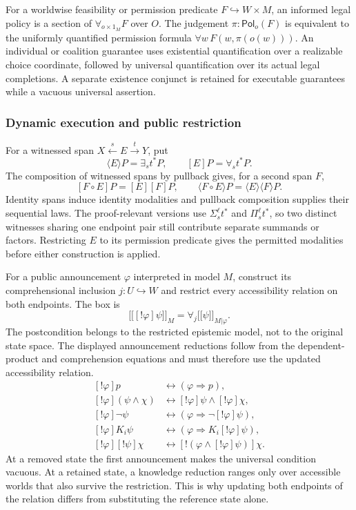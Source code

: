 \documentclass[11pt,a4paper]{article}
\numberwithin{equation}{section}
\theoremstyle{definition}
\theoremstyle{remark}
\theoremstyle{plain}
\providecommand{\llbracket}{\mathopen{[\![}}
\providecommand{\rrbracket}{\mathclose{]\!]}}
\begin{document}
For a worldwise feasibility or permission predicate $F\hookrightarrow
W\times M$, an informed legal policy is a section of
$\forall_{o\times1_M}F$ over $O$.  The judgement
$\pi:\mathsf{Pol}_o(F)$ is equivalent to the uniformly quantified
permission formula $\forall w\,F(w,\pi(o(w)))$.
An individual or coalition guarantee uses existential quantification
over a realizable choice coordinate, followed by universal quantification
over its actual legal completions.  A separate existence conjunct is
retained for executable guarantees while a
vacuous universal assertion.

\subsubsection{Dynamic execution and public restriction}

For a witnessed span $X\xleftarrow{s}E\xrightarrow{t}Y$, put
\[
\langle E\rangle P=\exists_s t^*P,
\qquad [E]P=\forall_s t^*P.
\]
The composition of witnessed spans by pullback gives, for a second
span $F$,
\[
[F\circ E]P=[E][F]P,
\qquad\langle F\circ E\rangle P
=\langle E\rangle\langle F\rangle P.
\]
Identity spans induce identity modalities and pullback
composition supplies their sequential laws. The proof-relevant
versions use $\Sigma_s^\ell t^*$ and $\Pi_s^\ell t^*$, so two
distinct witnesses sharing one endpoint pair still contribute
separate summands or factors. Restricting $E$ to its permission predicate gives the permitted
modalities before either construction is applied.

For a public announcement $\varphi$ interpreted in model $M$,
construct its comprehensional inclusion $j:U\hookrightarrow W$ and
restrict every accessibility relation on both endpoints.  The box is
\[
\llbracket[!\varphi]\psi\rrbracket_M
=\forall_j\llbracket\psi\rrbracket_{M|\varphi}.
\]
The postcondition belongs to the restricted epistemic model, not
to the original state space. The displayed announcement reductions
follow from the dependent-product and comprehension equations and
must therefore use the updated accessibility relation.
\[
\begin{aligned}
[!\varphi]p&\leftrightarrow(\varphi\Rightarrow p),\\
[!\varphi](\psi\wedge\chi)
 &\leftrightarrow[!\varphi]\psi\wedge[!\varphi]\chi,\\
[!\varphi]\neg\psi
 &\leftrightarrow(\varphi\Rightarrow\neg[!\varphi]\psi),\\
[!\varphi]K_i\psi
 &\leftrightarrow(\varphi\Rightarrow K_i[!\varphi]\psi),\\
[!\varphi][!\psi]\chi
 &\leftrightarrow[!(\varphi\wedge[!\varphi]\psi)]\chi.
\end{aligned}
\]
At a removed state the first announcement makes the universal
condition vacuous. At a retained state, a knowledge reduction ranges
only over accessible worlds that also survive the restriction.
This is why updating both endpoints of the relation differs from
substituting the reference state alone.
\end{document}
